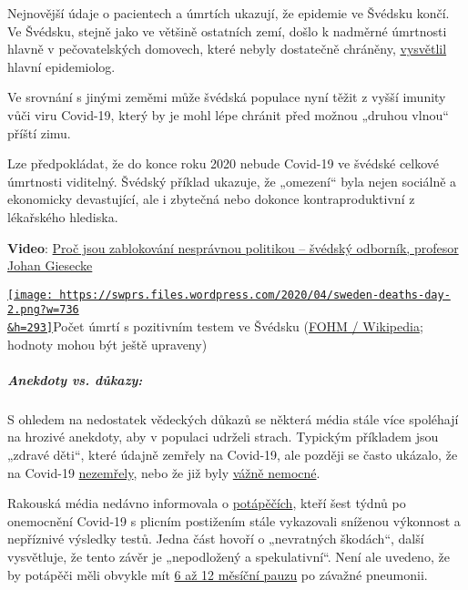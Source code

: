 Nejnovější údaje o pacientech a úmrtích ukazují, že epidemie ve Švédsku
končí. Ve Švédsku, stejně jako ve většině ostatních zemí, došlo k
nadměrné úmrtnosti hlavně v pečovatelských domovech, které nebyly
dostatečně chráněny,
\href{https://www.washingtontimes.com/news/2020/apr/15/sweden-coronavirus-rates-easing-despite-loose-rule/}{vysvětlil}
hlavní epidemiolog.

 Ve srovnání s jinými zeměmi může švédská populace nyní těžit z vyšší
imunity vůči viru Covid-19, který by je mohl lépe chránit před možnou
„druhou vlnou`` příští zimu.

 Lze předpokládat, že do konce roku 2020 nebude Covid-19 ve švédské
celkové úmrtnosti viditelný. Švédský příklad ukazuje, že „omezení`` byla
nejen sociálně a ekonomicky devastující, ale i zbytečná nebo dokonce
kontraproduktivní z lékařského hlediska.

\textbf{Video}: \href{https://www.youtube.com/watch?v=bfN2JWifLCY}{Proč
jsou zablokování nesprávnou politikou -- švédský odborník, profesor
Johan Giesecke}

\href{https://swprs.files.wordpress.com/2020/04/sweden-deaths-day-2.png}{\texttt{[image: https://swprs.files.wordpress.com/2020/04/sweden-deaths-day-2.png?w=736\\\&h=293]}}Počet
úmrtí s pozitivním testem ve Švédsku
(\href{https://en.wikipedia.org/wiki/2020_coronavirus_pandemic_in_Sweden\#Charts7be6f9f87457ed9aa}{FOHM
/ Wikipedia}; hodnoty mohou být ještě upraveny)

\hypertarget{anekdoty-vs-dux16fkazy}{%
\subparagraph{\texorpdfstring{\textbf{Anekdoty vs.
důkazy:}}{Anekdoty vs. důkazy:}}\label{anekdoty-vs-dux16fkazy}}

S ohledem na nedostatek vědeckých důkazů se některá média stále více
spoléhají na hrozivé anekdoty, aby v populaci udrželi strach. Typickým
příkladem jsou „zdravé děti``, které údajně zemřely na Covid-19, ale
později se často ukázalo, že na Covid-19
\href{https://www.dailymail.co.uk/news/article-8193487/Coroner-refuses-rule-COVID-19-cause-death-six-week-old-Connecticut-baby.html}{nezemřely},
nebo že již byly
\href{https://sports.yahoo.com/spanish-football-coach-francisco-garcia-163153573.html}{vážně
nemocné}.

Rakouská média nedávno informovala o
\href{https://www.rainews.it/tgr/tagesschau/articoli/2020/04/tag-Coronavirus-Lungeschaden-Forschung-Uniklinik-Innsbruck-6708e11e-28dc-4843-a760-e7f926ace61c.html}{potápěčích},
kteří šest týdnů po onemocnění Covid-19 s plicním postižením stále
vykazovali sníženou výkonnost a nepříznivé výsledky testů. Jedna část
hovoří o „nevratných škodách``, další vysvětluje, že tento závěr je
„nepodložený a spekulativní``. Není ale uvedeno, že by potápěči měli
obvykle mít
\href{https://www.deeperblue.com/pulmonary-considerations-in-diving/}{6
až 12 měsíční pauzu} po závažné pneumonii.

